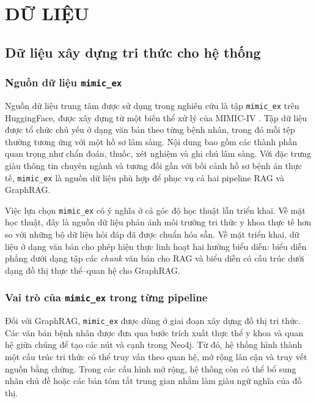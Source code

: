 \documentclass[a4paper,12pt,twoside]{report}
\begin{document}
\chapter{DỮ LIỆU}
\label{chap:data}

\section{Dữ liệu xây dựng tri thức cho hệ thống}
\subsection{Nguồn dữ liệu \texttt{mimic\_ex}}
Nguồn dữ liệu trung tâm được sử dụng trong nghiên cứu là tập \texttt{mimic\_ex} trên HuggingFace, được xây dựng từ một biến thể xử lý của MIMIC-IV \cite{johnson2023,mimicex}. Tập dữ liệu được tổ chức chủ yếu ở dạng văn bản theo từng bệnh nhân, trong đó mỗi tệp thường tương ứng với một hồ sơ lâm sàng. Nội dung bao gồm các thành phần quan trọng như chẩn đoán, thuốc, xét nghiệm và ghi chú lâm sàng. Với đặc trưng giàu thông tin chuyên ngành và tương đối gần với bối cảnh hồ sơ bệnh án thực tế, \texttt{mimic\_ex} là nguồn dữ liệu phù hợp để phục vụ cả hai pipeline RAG và GraphRAG.

Việc lựa chọn \texttt{mimic\_ex} có ý nghĩa ở cả góc độ học thuật lẫn triển khai. Về mặt học thuật, đây là nguồn dữ liệu phản ánh môi trường tri thức y khoa thực tế hơn so với những bộ dữ liệu hỏi đáp đã được chuẩn hóa sẵn. Về mặt triển khai, dữ liệu ở dạng văn bản cho phép hiện thực linh hoạt hai hướng biểu diễn: biểu diễn phẳng dưới dạng tập các \textit{chunk} văn bản cho RAG và biểu diễn có cấu trúc dưới dạng đồ thị thực thể--quan hệ cho GraphRAG.

\subsection{Vai trò của \texttt{mimic\_ex} trong từng pipeline}
Đối với GraphRAG, \texttt{mimic\_ex} được dùng ở giai đoạn xây dựng đồ thị tri thức. Các văn bản bệnh nhân được đưa qua bước trích xuất thực thể y khoa và quan hệ giữa chúng để tạo các nút và cạnh trong Neo4j. Từ đó, hệ thống hình thành một cấu trúc tri thức có thể truy vấn theo quan hệ, mở rộng lân cận và truy vết nguồn bằng chứng. Trong các cấu hình mở rộng, hệ thống còn có thể bổ sung nhãn chủ đề hoặc các bản tóm tắt trung gian nhằm làm giàu ngữ nghĩa của đồ thị.
\end{document}
